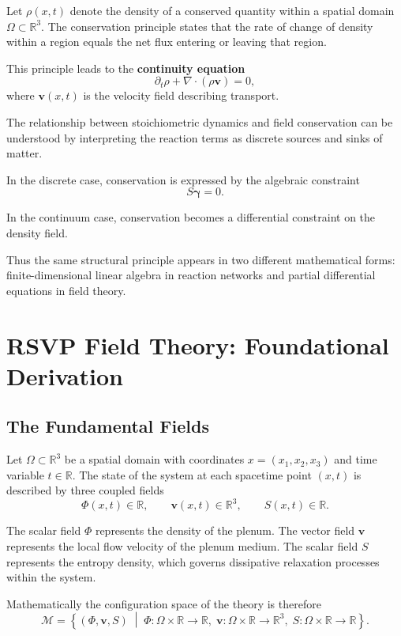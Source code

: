 \documentclass[11pt, openany]{book}
\theoremstyle{plain}
\theoremstyle{definition}
\theoremstyle{remark}
\begin{document}
Let $\rho(x,t)$ denote the density of a conserved quantity within a
spatial domain $\Omega\subset\mathbb{R}^3$. The conservation principle
states that the rate of change of density within a region equals the
net flux entering or leaving that region.

This principle leads to the \textbf{continuity equation}
\[
\partial_t\rho+\nabla\cdot(\rho\mathbf{v})=0,
\]
where $\mathbf{v}(x,t)$ is the velocity field describing transport.

\medskip

The relationship between stoichiometric dynamics and field conservation
can be understood by interpreting the reaction terms as discrete sources
and sinks of matter.

In the discrete case, conservation is expressed by the algebraic
constraint
\[
S\boldsymbol{\gamma}=0.
\]

In the continuum case, conservation becomes a differential constraint on
the density field.

Thus the same structural principle appears in two different mathematical
forms: finite-dimensional linear algebra in reaction networks and
partial differential equations in field theory.

\chapter{RSVP Field Theory: Foundational Derivation}

\section{The Fundamental Fields}

Let $\Omega\subset\mathbb{R}^3$ be a spatial domain with coordinates
$x=(x_1,x_2,x_3)$ and time variable $t\in\mathbb{R}$.  The state of the
system at each spacetime point $(x,t)$ is described by three coupled
fields
\[
\Phi(x,t)\in\mathbb{R},\qquad
\mathbf{v}(x,t)\in\mathbb{R}^3,\qquad
S(x,t)\in\mathbb{R}.
\]

The scalar field $\Phi$ represents the density of the plenum.  The
vector field $\mathbf{v}$ represents the local flow velocity of the
plenum medium.  The scalar field $S$ represents the entropy density,
which governs dissipative relaxation processes within the system.

Mathematically the configuration space of the theory is therefore
\[
\mathcal{M}
=
\left\{
(\Phi,\mathbf{v},S)
\;\middle|\;
\Phi:\Omega\times\mathbb{R}\to\mathbb{R},
\;
\mathbf{v}:\Omega\times\mathbb{R}\to\mathbb{R}^3,
\;
S:\Omega\times\mathbb{R}\to\mathbb{R}
\right\}.
\]
\end{document}
